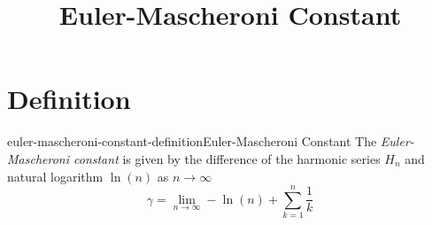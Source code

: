 \documentclass[preview]{standalone}
\begin{document}
\title{Euler-Mascheroni Constant}
\genpage

\section{Definition}

\begin{snippetdefinition}{euler-mascheroni-constant-definition}{Euler-Mascheroni Constant}
    The \textit{Euler-Mascheroni constant} is given by the difference
    of the harmonic series \(H_n\) and natural logarithm \(\ln(n)\) as \(n\to \infty\)
    \[
        \gamma = \lim_{n\to\infty} -\ln(n)+\sum_{k=1}^{n}\frac{1}{k}
    \]
\end{snippetdefinition}
\end{document}
